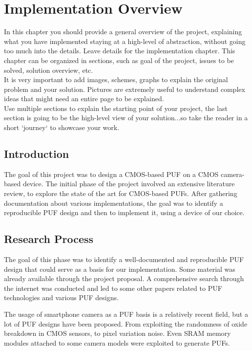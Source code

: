 \chapter{Implementation Overview}
In this chapter you should provide a general overview of the project, explaining what you have implemented staying at a high-level of abstraction, without going too much into the details. Leave details for the implementation chapter. This chapter can be organized in sections, such as goal of the project, issues to be solved, solution overview, etc.\\It is very important to add images, schemes, graphs to explain the original problem and your solution. Pictures are extremely useful to understand complex ideas that might need an entire page to be explained.\\Use multiple sections to explain the starting point of your project, the last section is going to be the high-level view of your solution...so take the reader in a short `journey` to showcase your work.

\section{\textbf{Introduction}}
The goal of this project was to design a CMOS-based PUF on a CMOS camera-based device.
The initial phase of the project involved an extensive literature review, to explore the state of the art for CMOS-based PUFs.
After gathering documentation about various implementations, the goal was to identify a reproducible PUF design and then to implement it, using a device of our choice.

\section{\textbf{Research Process}}
The goal of this phase was to identify a well-documented and reproducible PUF design that could serve as a basis for our implementation.
Some material was already available through the project proposal. A comprehensive search through the internet was conducted and led to some other papers
related to PUF technologies and various PUF designs.

The usage of smartphone camera as a PUF basis is a relatively recent field, but a lot of PUF designs have been proposed. From exploiting the randomness of oxide breakdown in CMOS
sensors, to pixel variation noise. Even SRAM memory modules attached to some camera models were exploited to generate PUFs.

